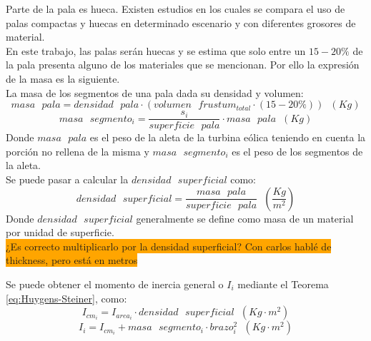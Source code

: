 Parte de la pala es hueca. Existen estudios \cite{Pourrajabian2016} en los cuales se compara el uso de palas compactas y huecas en determinado escenario y con diferentes grosores de material. \\

En este trabajo, las palas serán huecas y se estima que solo entre un $15-20\%$ de la pala presenta alguno de los materiales que se mencionan. Por ello la expresión de la masa es la siguiente. \\

La masa de los segmentos de una pala dada su densidad y volumen:
 \begin{equation}
 masa \text{ } pala = densidad \text{ } pala \cdot (volumen \text{ } frustum_{total} \cdot (15-20\%) ) \hspace{7pt} (Kg)
 \end{equation}
 \begin{equation}
 masa \text{ } segmento_i = \dfrac{s_i}{superficie \text{ } pala} \cdot masa \text{ } pala \hspace{7pt} (Kg)
 \label{def:masa_pala} 
 \end{equation}
  Donde $ masa \text{ } pala $ es el peso de la aleta de la turbina eólica teniendo en cuenta la porción no rellena de la misma y $ masa \text{ } segmento_i $ es el peso de los segmentos de la aleta.\\
 
 
Se puede pasar a calcular la $densidad \text{ } superficial$ como:
  \begin{equation}
 densidad \text{ } superficial = \dfrac{masa \text{ } pala}{ superficie \text{ } pala} \hspace{7pt} \left(\dfrac{Kg}{m^2}\right)
 \label{def:densidad_superficial}
 \end{equation}
 Donde $ densidad \text{ } superficial $ generalmente se define como masa de un material por unidad de superficie. \\
 
 
  \colorbox{orange}{¿Es correcto multiplicarlo por la densidad superficial? Con carlos hablé de thickness, pero está en metros}
 
Se puede obtener el momento de inercia general o $I_i$ mediante el Teorema \ref{eq:Huygens-Steiner}, como:
  \begin{equation}
I_{cm_i} = I_{area_i} \cdot densidad \text{ } superficial \hspace{7pt} (Kg \cdot m^2)
 \label{def:momento_inercia_cm}
 \end{equation}
 \begin{equation}
I_i = I_{cm_i} + masa \text{ } segmento_i \cdot brazo_i^2 \hspace{7pt} (Kg \cdot m^2)
 \label{def:momento_inercia_general}
 \end{equation}

